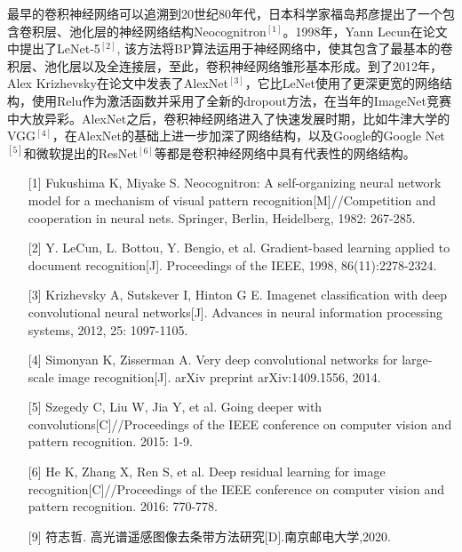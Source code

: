 \documentclass[UTF8,zihao=-4]{oucart}
\begin{document}
\begin{framed}
最早的卷积神经网络可以追溯到20世纪80年代，日本科学家福岛邦彦提出了一个包含卷积层、池化层的神经网络结构Neocognitron$^{[1]}$。1998年，Yann Lecun在论文中提出了LeNet-5$^{[2]}$, 该方法将BP算法运用于神经网络中，使其包含了最基本的卷积层、池化层以及全连接层，至此，卷积神经网络雏形基本形成。到了2012年，Alex Krizhevsky在论文中发表了AlexNet$^{[3]}$，它比LeNet使用了更深更宽的网络结构，使用Relu作为激活函数并采用了全新的dropout方法，在当年的ImageNet竞赛中大放异彩。AlexNet之后，卷积神经网络进入了快速发展时期，比如牛津大学的VGG$^{[4]}$，在AlexNet的基础上进一步加深了网络结构，以及Google的Google Net$^{[5]}$和微软提出的ResNet$^{[6]}$等都是卷积神经网络中具有代表性的网络结构。

\begin{itemize}
	\item[{[1]}]
	Fukushima K, Miyake S. Neocognitron: A self-organizing neural network model for a mechanism of visual pattern recognition[M]//Competition and cooperation in neural nets. Springer, Berlin, Heidelberg, 1982: 267-285.

	\item[{[2]}]
	Y. LeCun, L. Bottou, Y. Bengio, et al. Gradient-based learning applied to document recognition[J]. Proceedings of the IEEE, 1998, 86(11):2278-2324.

	\item[{[3]}]
	Krizhevsky A, Sutskever I, Hinton G E. Imagenet classification with deep convolutional neural networks[J]. Advances in neural information processing systems, 2012, 25: 1097-1105.

	\item[{[4]}]
	Simonyan K, Zisserman A. Very deep convolutional networks for large-scale image recognition[J]. arXiv preprint arXiv:1409.1556, 2014.

	\item[{[5]}]
	Szegedy C, Liu W, Jia Y, et al. Going deeper with convolutions[C]//Proceedings of the IEEE conference on computer vision and pattern recognition. 2015: 1-9.

	\item[{[6]}]
	He K, Zhang X, Ren S, et al. Deep residual learning for image recognition[C]//Proceedings of the IEEE conference on computer vision and pattern recognition. 2016: 770-778.

	\item[{[9]}]
	符志哲. 高光谱遥感图像去条带方法研究[D].南京邮电大学,2020.

\end{itemize}


\end{framed}
\end{document}
